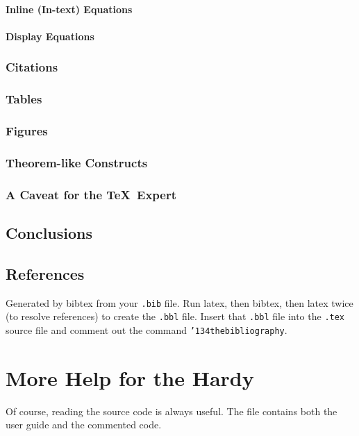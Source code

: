 \documentclass[sigconf]{acmart}
\begin{document}
\paragraph{Inline (In-text) Equations}
\paragraph{Display Equations}
\subsubsection{Citations}
\subsubsection{Tables}
\subsubsection{Figures}
\subsubsection{Theorem-like Constructs}
\subsubsection*{A Caveat for the \TeX\ Expert}
\subsection{Conclusions}
\subsection{References}

Generated by bibtex from your \texttt{.bib} file.  Run latex, then
bibtex, then latex twice (to resolve references) to create the
\texttt{.bbl} file.  Insert that \texttt{.bbl} file into the
\texttt{.tex} source file and comment out the command
\texttt{{\char'134}thebibliography}.


\section{More Help for the Hardy}

Of course, reading the source code is always useful.  The file
 contains both the user guide and the commented code.
\end{document}
